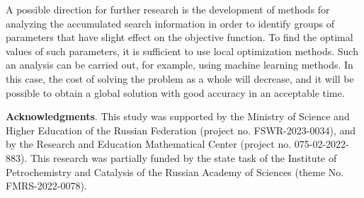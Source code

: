 \documentclass{svproc}
\begin{document}
A possible direction for further research is the development of methods for analyzing the accumulated search information in order to identify groups of parameters that have slight effect on the objective function. To find the optimal values of such parameters, it is sufficient to use local optimization methods. Such an analysis can be carried out, for example, using machine learning methods. In this case, the cost of solving the problem as a whole will decrease, and it will be possible to obtain a global solution with good accuracy in an acceptable time.


\medskip

\textbf{Acknowledgments}. This study was supported by the Ministry of Science and Higher Education of the Russian Federation (project no. FSWR-2023-0034), and by the Research and Education Mathematical Center (project no.  075-02-2022-883). This research was partially funded by the state task of the Institute of Petrochemistry and Catalysis of the Russian Academy of Sciences (theme No. FMRS-2022-0078).


%
%

{}
\end{document}
